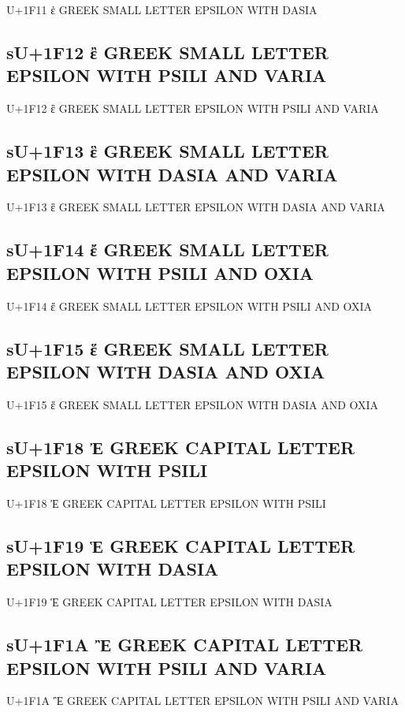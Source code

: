 U+1F11 ἑ GREEK SMALL LETTER EPSILON WITH DASIA

\subsection{sU+1F12 ἒ GREEK SMALL LETTER EPSILON WITH PSILI AND VARIA}

U+1F12 ἒ GREEK SMALL LETTER EPSILON WITH PSILI AND VARIA

\subsection{sU+1F13 ἓ GREEK SMALL LETTER EPSILON WITH DASIA AND VARIA}

U+1F13 ἓ GREEK SMALL LETTER EPSILON WITH DASIA AND VARIA

\subsection{sU+1F14 ἔ GREEK SMALL LETTER EPSILON WITH PSILI AND OXIA}

U+1F14 ἔ GREEK SMALL LETTER EPSILON WITH PSILI AND OXIA

\subsection{sU+1F15 ἕ GREEK SMALL LETTER EPSILON WITH DASIA AND OXIA}

U+1F15 ἕ GREEK SMALL LETTER EPSILON WITH DASIA AND OXIA

\subsection{sU+1F18 Ἐ GREEK CAPITAL LETTER EPSILON WITH PSILI}

U+1F18 Ἐ GREEK CAPITAL LETTER EPSILON WITH PSILI

\subsection{sU+1F19 Ἑ GREEK CAPITAL LETTER EPSILON WITH DASIA}

U+1F19 Ἑ GREEK CAPITAL LETTER EPSILON WITH DASIA

\subsection{sU+1F1A Ἒ GREEK CAPITAL LETTER EPSILON WITH PSILI AND VARIA}

U+1F1A Ἒ GREEK CAPITAL LETTER EPSILON WITH PSILI AND VARIA

